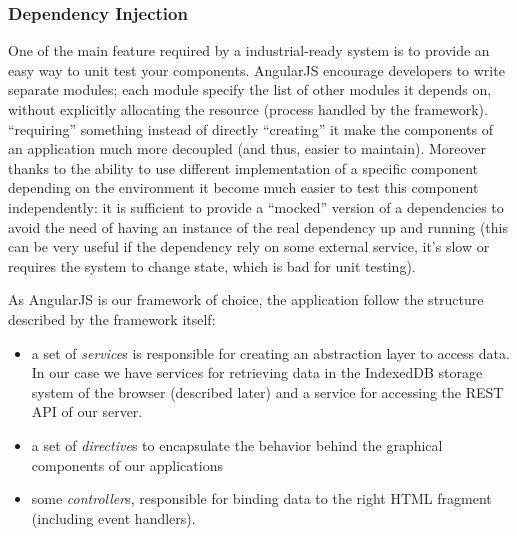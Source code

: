 \documentclass[a4paper,12pt]{report}
\begin{document}
\subsubsection{Dependency Injection}
One of the main feature required by a industrial-ready system is to provide an easy way to unit test your components. AngularJS encourage developers to write separate modules; each module specify the list of other modules it depends on, without explicitly allocating the resource (process handled by the framework). ``requiring'' something instead of directly ``creating'' it make the components of an application much more decoupled (and thus, easier to maintain). Moreover thanks to the ability to use different implementation of a specific component depending on the environment it become much easier to test this component independently: it is sufficient to provide a ``mocked'' version of a dependencies to avoid the need of having an instance of the real dependency up and running (this can be very useful if the dependency rely on some external service, it's slow or requires the system to change state, which is bad for unit testing).


As AngularJS is our framework of choice, the application follow the structure described by the framework itself:
\begin{itemize}
\item a set of \emph{service}s is responsible for creating an abstraction layer to access data. In our case we have services for retrieving data in the IndexedDB storage system of the browser (described later) and a service for accessing the REST API of our server.
\item a set of \emph{directive}s to encapsulate the behavior behind the graphical components of our applications 
\item some \emph{controller}s, responsible for binding data to the right HTML fragment (including event handlers).
\end{itemize}
\end{document}
